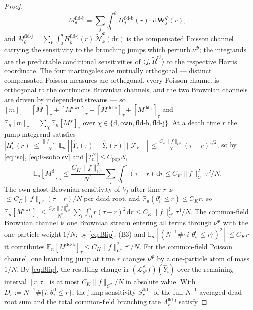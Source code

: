 \documentclass[a4paper,fleqn]{cas-sc}
\newcommand{\mhyphen}{\text{-}}
\theoremstyle{definition}
\theoremstyle{remark}
\begin{document}
\begin{proof}
\[M^{\mathrm{fld\mhyphen b}}_\theta=\sum_j\int_0^\theta H^{\mathrm{fld\mhyphen b}}_j(r)\!\cdot\!\mathrm d\mathbf W^\Phi_j(r),
\]
and $M^{\mathrm{fld\mhyphen j}}_\theta=\sum_k\int_0^\theta H^{\mathrm{fld\mhyphen j}}_k(r)\,\widetilde{\mathcal N}^\Phi_k(\mathrm dr)$
is the compensated Poisson channel carrying the sensitivity to the branching jumps which perturb
$\nu^\Phi$; the integrands are the predictable conditional sensitivities of
$\langle f,\widetilde R^{\mathrm{gt}}\rangle$ to the respective Harris coordinate. The four martingales
are mutually orthogonal --- distinct compensated Poisson measures are orthogonal, every Poisson
channel is orthogonal to the continuous Brownian channels, and the two Brownian channels are driven
by independent streams --- so
$[m]_\tau=[M^{\mathrm d}]_\tau+[M^{\mathrm{own}}]_\tau+[M^{\mathrm{fld\mhyphen b}}]_\tau+[M^{\mathrm{fld\mhyphen j}}]_\tau$ and
$\mathbb E_n[m]_\tau=\sum_{\chi}\mathbb E_n[M^\chi]_\tau$ over $\chi\in\{\mathrm d,\mathrm{own},\mathrm{fld\mhyphen b},\mathrm{fld\mhyphen j}\}$. At a death time $r$ the jump integrand satisfies
$|H^{\mathrm d}_i(r)|\le\frac{\|f\|_{C^1}}N\mathbb E_n[|\widehat Y_i(\tau)-\widehat Y_i(r)|\mid\mathcal F_{r-}]\le\frac{C_K\|f\|_{C^1}}N(\tau-r)^{1/2}$,
so by \eqref{eq:iso}, \eqref{eq:ls-sobolev} and $|\mathcal I^N_n|\le C_{\mathrm{pop}}N$,
\[
\mathbb E_n[M^{\mathrm d}]_\tau
\le\frac{C_K\|f\|_{C^1}^2}{N^2}\sum_i\int_0^\tau(\tau-r)\,\mathrm dr\le C_K\|f\|_{C^1}^2\tau^2/N .
\]
The own-ghost Brownian sensitivity of $V_f$ after time $r$ is $\le C_K\|f\|_{C^2}(\tau-r)/N$ per
dead root, and $\mathbb P_n(\theta^{\mathrm d}_i\le r)\le C_Kr$, so
$\mathbb E_n[M^{\mathrm{own}}]_\tau\le\frac{C_K\|f\|_{C^2}^2}{N^2}\sum_i\int_0^\tau r(\tau-r)^2\,\mathrm dr\le C_K\|f\|_{C^2}^2\tau^4/N$.
The common-field Brownian channel is one Brownian stream entering all terms through $\nu^\Phi$ with the
one-particle weight $1/N$; by \eqref{eq:Blip}, (B3) and
$\mathbb E_n[(N^{-1}\#\{i:\theta^{\mathrm d}_i\le r\})^2]\le C_Kr$ it contributes
$\mathbb E_n[M^{\mathrm{fld\mhyphen b}}]_\tau\le C_K\|f\|_{C^2}^2\tau^4/N$.
For the common-field Poisson channel, one branching jump at time $r$ changes
$\nu^\Phi$ by a one-particle atom of mass $1/N$. By \eqref{eq:Blip}, the resulting change in
$(\mathcal L^{\mathsf A}_{\nu^\Phi}f)(\widehat Y_i)$ over the remaining interval $[r,\tau]$ is at most
$C_K\|f\|_{C^2}/N$ in absolute value. With $D_r:=N^{-1}\#\{i:\theta_i^{\mathrm d}\le r\}$, the jump
sensitivity $S^{\mathrm{fld\mhyphen j}}_r$ of the full $N^{-1}$-averaged dead-root sum and the total
common-field branching rate $\Lambda^{\mathrm{fld\mhyphen j}}_r$ satisfy

\end{proof}
\end{document}
